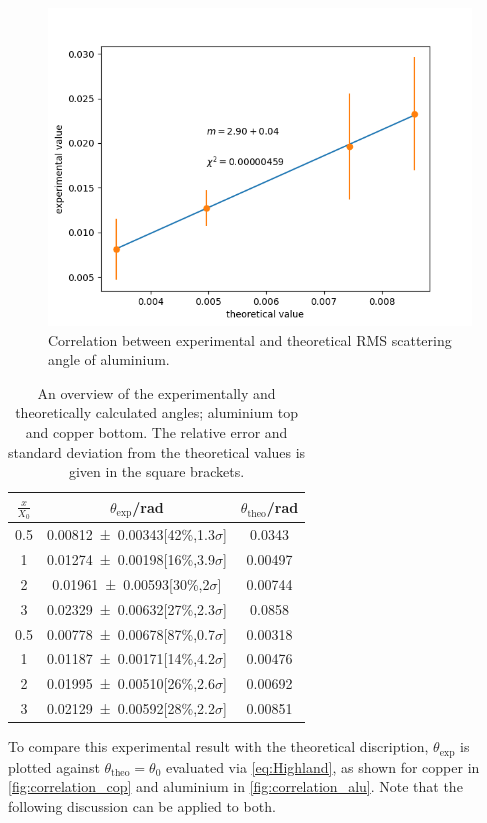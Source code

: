 \documentclass[sn-mathphys-num,iicol]{sn-jnl}
\theoremstyle{thmstyleone}
\theoremstyle{thmstyletwo}
\theoremstyle{thmstylethree}
\begin{document}
\begin{figure}
  \includegraphics[width=0.9\linewidth]{../src/elsa/finished_plots/Aluminium.png}
  \caption{Correlation between experimental and theoretical RMS scattering angle of aluminium.}
  \label{fig:correlation_alu}  
\end{figure}


\begin{table}
  \begin{tabular}{ccc}
    \toprule
    $\tfrac{x}{X_0}$ & $\theta _\text{exp}$/rad & $\theta _\text{theo}$/rad \\
    \midrule
    0.5 & \num{.00812+-.00343}[42\%,1.3$\sigma$] & 0.0343\\
    1 & \num{.01274+-.00198}[16\%,3.9$\sigma$] & 0.00497\\
    2 & \num{.01961+-.00593}[30\%,2$\sigma$] & 0.00744\\
    3 & \num{.02329+-.00632}[27\%,2.3$\sigma$] & 0.0858\\
    \midrule
    0.5 & \num{.00778+-.00678}[87\%,0.7$\sigma$] & 0.00318\\
    1 & \num{.01187+-.00171}[14\%,4.2$\sigma$] & 0.00476\\
    2 & \num{.01995+-.00510}[26\%,2.6$\sigma$] & 0.00692\\
    3 & \num{.02129+-.00592}[28\%,2.2$\sigma$] & 0.00851\\
    \bottomrule
  \end{tabular}
  \caption{An overview of the experimentally and theoretically calculated angles; aluminium top and copper bottom. 
  The relative error and standard deviation from the theoretical values is given in the square brackets.}
\end{table}
To compare this experimental result with the theoretical discription, $\theta_\text{exp}$ is plotted against $\theta_\text{theo} = \theta_0$ evaluated via \autoref{eq:Highland}, as shown for copper in \autoref{fig:correlation_cop} and aluminium in \autoref{fig:correlation_alu}.
Note that the following discussion can be applied to both. 
\end{document}
